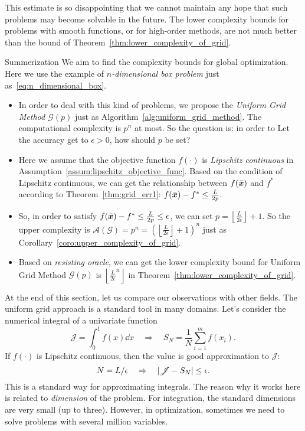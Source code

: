 This estimate is so disappointing that we cannot maintain any hope that such problems may become solvable in the future. The lower complexity bounds for problems 
with smooth functions, or for high-order methods, are not much better than the bound of Theorem~\ref{thm:lower_complexity_of_grid}.

\begin{boxnote}{Summerization}
    We aim to find the complexity bounds for global optimization. Here we use the example of \emph{\(n\)-dimensional box problem} just as~\ref{eq:n_dimensional_box}. 
    \begin{itemize}
        \item In order to deal with this kind of problems, we propose the \emph{Uniform Grid Method \(\mathscr{G}(p)\)} just as Algorithm~\ref{alg:uniform_grid_method}. 
              The computational complexity is \(p^n\) at most. So the question is: in order to Let the accuracy get to \(\epsilon > 0\), how should \(p\) be set?
        \item Here we assume that the objective function \(f(\cdot)\) is \emph{Lipschitz continuous} in Assumption~\ref{assum:lipschitz_objective_func}. Based on the condition of Lipschitz continuous,
              we can get the relationship between \(f(\bar{\bm{x}})\) and \(f^*\) according to Theorem~\ref{thm:grid_err1}: \(f(\bar{\bm{x}}) - f^* \le \frac{L}{2p}\). 
        \item So, in order to satisfy \(f(\bar{\bm{x}}) - f^* \le \frac{L}{2p} \le \epsilon\), we can set \(p =\left\lfloor \frac{L}{2\epsilon} \right\rfloor + 1\). So the upper complexity is 
              \(\mathscr{A}(\mathscr{G}) = p^n = \left(\left\lfloor \frac{L}{2\epsilon} \right\rfloor + 1\right)^n\) just as Corollary~\ref{coro:upper_complexity_of_grid}.
        \item Based on \emph{resisting oracle}, we can get the lower complexity bound for Uniform Grid Method \(\mathscr{G}(p)\) is \(\left\lfloor \frac{L}{2\epsilon}^n \right\rfloor\) in Theorem~\ref{thm:lower_complexity_of_grid}.
    \end{itemize}
\end{boxnote}

At the end of this section, let us compare our observations with other fields. The uniform grid approach is a standard tool in many domains. Let's consider the numerical integral of a univariate function
\[
    \mathscr{J} = \int_{0}^1 f(x) \dd x \quad \Rightarrow \quad S_N = \frac{1}{N} \sum_{i=1}^m f(x_i).
\]
If \(f(\cdot)\) is Lipschitz continuous, then the value is good approximation to \(\mathscr{J}\):
\[
    N = L / \epsilon  \quad \Rightarrow \quad \abs{\mathscr{J} - S_N} \le \epsilon.
\]
This is a standard way for approximating integrals. The reason why it works here is related to \emph{dimension} of the problem. For integration, the standard dimensions are very small (up to three). However, in optimization, sometimes we need to
solve problems with several million variables.

